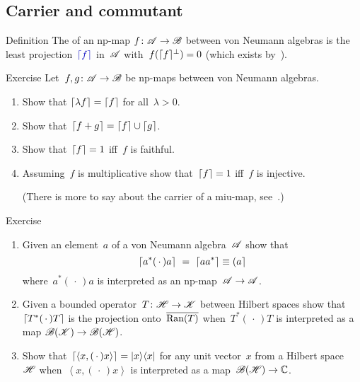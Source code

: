 \documentclass[a]{subfiles}
\begin{document}
\subsection{Carrier and commutant}
\begin{parsec}%
\begin{point}[carrier]{Definition}%
The 
of an np-map $f\colon \mathscr{A}\to\mathscr{B}$
between von Neumann algebras
is the least projection~$\Define{\ceil{f}}$ in~$\mathscr{A}$
with~$f(\smash{\left\lceil f\right\rceil}^\perp)=0$
(which exists by~).
\end{point}
\begin{point}{Exercise}%
Let~$f,g\colon \mathscr{A}\to\mathscr{B}$
be np-maps between von Neumann algebras.
\begin{enumerate}
\item
Show that $\left\lceil\lambda f\right\rceil=\left\lceil f\right\rceil$
for all~$\lambda>0$.
\item
Show that~$\left\lceil f+g\right\rceil=\left\lceil f\right\rceil\cup\left\lceil g\right\rceil$.
\item
Show that~$\left\lceil f\right\rceil=1$ iff~$f$ is faithful.
\item
Assuming~$f$ is multiplicative
show that~$\left\lceil f\right\rceil=1$ iff~$f$ is injective.

(There is more to say about
the carrier of a miu-map, see~.)
\end{enumerate}
\end{point}
\begin{point}{Exercise}%
\begin{enumerate}
\item
Given an element~$a$ of a von Neumann algebra~$\mathscr{A}$
show that 
\begin{equation*}
\ceil{a^*(\,\cdot\,)a}\ =\ \ceil{aa^*}\equiv \ceilr{a}
\end{equation*}
where~$a^*(\,\cdot\,)a$
is interpreted as an np-map~$\mathscr{A}\to\mathscr{A}$.
\item
Given a bounded operator~$T\colon \mathscr{H}\to\mathscr{K}$
between Hilbert spaces
show that~$\left\lceil T^*(\,\cdot\,)T\right\rceil$
is the projection onto~$\overline{\operatorname{Ran}(T)}$
when~$T^*(\,\cdot\,)T$
is interpreted 
as a map
$\mathscr{B}(\mathscr{K})\to\mathscr{B}(\mathscr{H})$.
\item
Show that~$\left\lceil\left<x,(\,\cdot\,)x\right>\right\rceil=\left|x\right>\!\left<x\right|$
for any unit vector~$x$ from a Hilbert space~$\mathscr{H}$
when~$\left<x,(\,\cdot\,)x\right>$
is interpreted as a map~$\mathscr{B}(\mathscr{H})\to\mathbb{C}$.


\end{enumerate}
\end{point}
\end{parsec}
\end{document}
